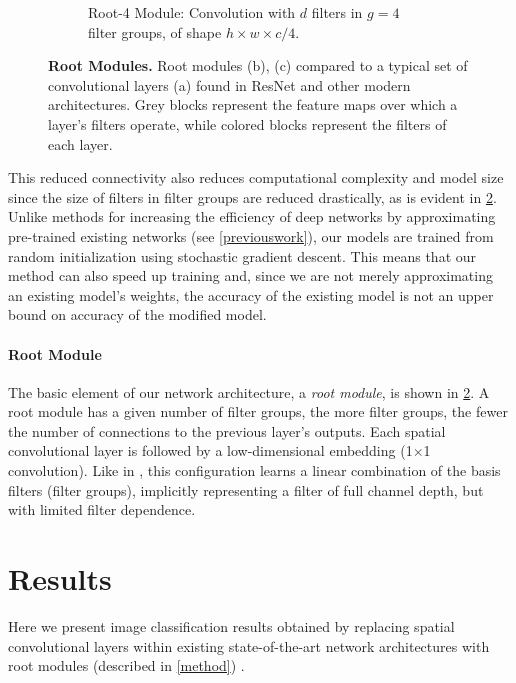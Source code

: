 \documentclass[thesis]{subfiles}
\begin{document}
\begin{figure}[tbp]
\begin{subfigure}[b]{0.95\textwidth}
			\caption{Root-4 Module: Convolution with $d$ filters in $g = 4$ filter groups, of shape $h\times w\times c/4$.}
			\label{fig:rootresnet4}
		\end{subfigure}
		\caption[Root modules: learning a channel basis for filters.]{\textbf{Root Modules.} Root modules (b), (c) compared to a typical set of convolutional layers (a) found in ResNet and other modern architectures. Grey blocks represent the feature maps over which a layer's filters operate, while colored blocks represent the filters of each layer. 
		}
		\label{fig:rootmodule}
	\end{figure}
	This reduced connectivity also reduces computational complexity and model size since the size of filters in filter groups are reduced drastically, as is evident in \cref{fig:rootmodule}. Unlike methods for increasing the efficiency of deep networks by approximating pre-trained existing networks (see \cref{previouswork}), our models are trained from random initialization using stochastic gradient descent. This means that our method can also speed up training and, since we are not merely approximating an existing model's weights, the accuracy of the existing model is not an upper bound on accuracy of the modified model.
	
	\paragraph{Root Module}
	The basic element of our network architecture, a \emph{root module}, is shown in \cref{fig:rootmodule}. A root module has a given number of filter groups, the more filter groups, the fewer the number of connections to the previous layer's outputs. Each spatial convolutional layer is followed by a low-dimensional embedding (1$\times$1 convolution). Like in \citep{Ioannou2016}, this configuration  learns a linear combination of the basis filters (filter groups), implicitly representing a filter of full channel depth, but with limited filter dependence.
	
	\section{Results}
	Here we present image classification results obtained by replacing spatial convolutional layers within existing state-of-the-art network architectures with root modules (described in \cref{method}) .
	
\end{document}
